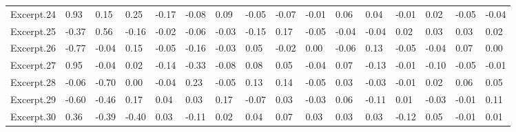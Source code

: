 \documentclass[
]{article}
\newenvironment{lltable}{\begin{landscape}\begin{center}\begin{ThreePartTable}}{\end{ThreePartTable}\end{center}\end{landscape}}
\begin{document}
\begin{lltable}
{\begin{longtable}{llllllllllllllll}
Excerpt.24 & 0.93 & 0.15 & 0.25 & -0.17 & -0.08 & 0.09 & -0.05 & -0.07 & -0.01 & 0.06 & 0.04 & -0.01 & 0.02 & -0.05 & -0.04\\
Excerpt.25 & -0.37 & 0.56 & -0.16 & -0.02 & -0.06 & -0.03 & -0.15 & 0.17 & -0.05 & -0.04 & -0.04 & 0.02 & 0.03 & 0.03 & 0.02\\
Excerpt.26 & -0.77 & -0.04 & 0.15 & -0.05 & -0.16 & -0.03 & 0.05 & -0.02 & 0.00 & -0.06 & 0.13 & -0.05 & -0.04 & 0.07 & 0.00\\
Excerpt.27 & 0.95 & -0.04 & 0.02 & -0.14 & -0.33 & -0.08 & 0.08 & 0.05 & -0.04 & 0.07 & -0.13 & -0.01 & -0.10 & -0.05 & -0.01\\
Excerpt.28 & -0.06 & -0.70 & 0.00 & -0.04 & 0.23 & -0.05 & 0.13 & 0.14 & -0.05 & 0.03 & -0.03 & -0.01 & 0.02 & 0.06 & 0.05\\
Excerpt.29 & -0.60 & -0.46 & 0.17 & 0.04 & 0.03 & 0.17 & -0.07 & 0.03 & -0.03 & 0.06 & -0.11 & 0.01 & -0.03 & -0.01 & 0.11\\
Excerpt.30 & 0.36 & -0.39 & -0.40 & 0.03 & -0.11 & 0.02 & 0.04 & 0.07 & 0.03 & 0.03 & 0.03 & -0.12 & 0.05 & -0.01 & 0.01\\
\bottomrule
\end{longtable}

}

\end{lltable}
\end{document}
